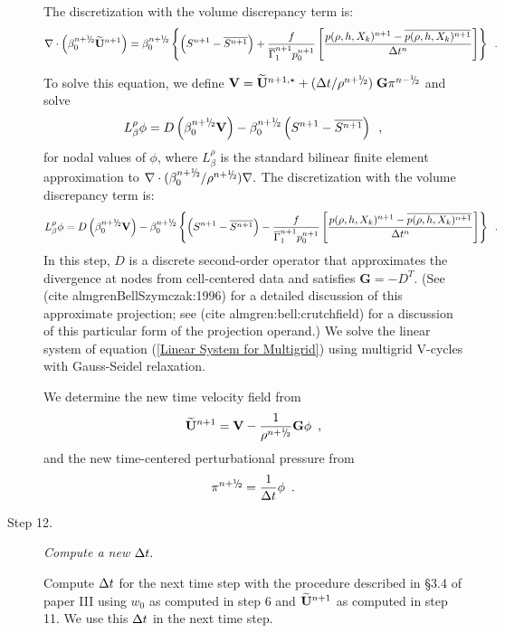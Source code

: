 \begin{description}
The discretization with the volume discrepancy term is:
\begin{equation}
\nabla \cdot \left(\beta_0^{\nph} \Ubt^{n+1} \right)  = \beta_0^{\nph}\left\{  \left(S^{n+1} - \overline{S^{n+1}} \right)
+ \frac{f}{\gammabar^{n+1} p_0^{n+1}}
\left[\frac{p(\rho,h,X_k)^{n+1} - \overline{p(\rho,h,X_k)^{n+1}}}{\Delta t^n}\right]\right\}
\enskip .
\end{equation}

To solve this equation, we define
${\bf V} = \Ubt^{n+1,\star} + ( \dt / \rho^\nph ) \; \mathbf{G} \pi^\nmh$ 
and solve
\begin{equation}
 L_\beta^\rho \phi = D \left ( \beta_0^{\nph} {\bf V} \right) - \beta_0^{\nph} 
\left(S^{n+1}-\overline{S^{n+1}} \right) \enskip, \label{Linear System for Multigrid}
\end{equation}
for nodal values of $\phi$, where $L_\beta^\rho$ is the standard bilinear
finite element approximation to $\nabla \cdot ({\beta_0^\nph}/{\rho^\nph}) \nabla.$
The discretization with the volume discrepancy term is:
\begin{equation}
 L_\beta^\rho \phi =
   D \left ( \beta_0^{\nph} {\bf V} \right) - \beta_0^{\nph}\left\{ \left(S^{n+1}-\overline{S^{n+1}} \right)
- \frac{f}{\gammabar^{n+1} p_0^{n+1}}
\left[\frac{p(\rho,h,X_k)^{n+1} - \overline{p(\rho,h,X_k)^{n+1}}}{\Delta t^n}\right]\right\} \enskip.
\end{equation}
In this step, $D$ is a discrete second-order operator that approximates the 
divergence at nodes from cell-centered data and satisfies
$\mathbf{G} = -D^T.$ 
(See (cite almgrenBellSzymczak:1996) for a detailed discussion of this
approximate projection; see (cite almgren:bell:crutchfield) for a discussion
of this particular form of the projection operand.)  
We solve the linear system of equation (\ref{Linear System for Multigrid})
using multigrid V-cycles with Gauss-Seidel relaxation.

We determine the new time velocity field from
\begin{equation}
\Ubt^{n+1} = {\bf V} - \frac{1}{\rho^\nph} \mathbf{G} \phi \enskip ,
\end{equation}
and the new time-centered perturbational pressure from
\begin{equation}
  \pi^\nph = \frac{1}{\dt} \phi \enskip .
\end{equation}

\item[Step 12.] {\em Compute a new $\Delta t.$}

Compute $\Delta t$ for the next time step with the procedure described in \S 3.4 of paper III
using $w_0$ as computed in step 6 and
$\widetilde{{\bf U}}^{n+1}$ as computed in step 11.  We use this $\Delta t$ in the next time step. 


\end{description}

